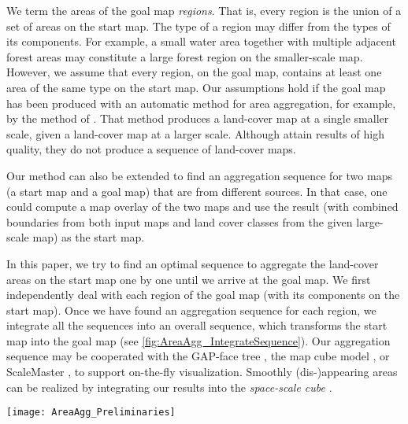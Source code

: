\documentclass[acmsmall,natbib=false]{acmart}
\begin{document}
We term the areas of the goal map \emph{regions}.
That is, every region is the union of a set of areas 
on the start map.
The type of a region may differ from the types of its components. 
For example, a small water area together with 
multiple adjacent forest areas may constitute 
a large forest region on the smaller-scale map.
However, we assume that every region, on the goal map, 
contains at least one area of the same type on the start map.
Our assumptions hold if the goal map has been produced 
with an automatic method for area aggregation, 
for example, by the method of \citet{HaunertWolff2010AreaAgg}.
That method produces a land-cover map at a single smaller scale, 
given a land-cover map at a larger scale.
Although \textcite{HaunertWolff2010AreaAgg}
attain results of high quality, 
they do not produce a sequence of land-cover maps.

Our method can also be extended to find an aggregation sequence 
for two maps (a start map and a goal map) that are from different sources.
In that case, one could compute a map overlay of the two maps
and use the result 
(with combined boundaries from both input maps and land cover classes 
from the given large-scale map) 
as the start map.

In this paper, we try to find an optimal sequence
to aggregate the land-cover areas on the start map
one by one until we arrive at the goal map.
We first independently deal with each region of the goal map 
(with its components on the start map).
Once we have found an aggregation sequence for each region, 
we integrate all the sequences into an overall sequence,
which transforms the start map into the goal map
(see \fig\ref{fig:AreaAgg_IntegrateSequence}). 
Our aggregation sequence may be cooperated with
the GAP-face tree \citep{vanOosterom2005},
the map cube model \citep{Timpf1998},
or ScaleMaster \citep{Brewer2007Guidelines,Touya2013ScaleMaster}, 
to support on-the-fly visualization.
Smoothly (dis-)appearing areas can be realized
by integrating our results into the \emph{space-scale cube}
\parencite{vanOosterom2014tGAP,vanOosterom2014tGAPSSC}.

\begin{figure*}[tb]
\centering
\texttt{[image: AreaAgg\_Preliminaries]}
\caption{Integrating two aggregation sequences 
	of different regions: 
	the resulting sequence contains the given sequences 
	as subsequences and 
	always takes the subdivision with smallest patch next.
	The gray arrows show the integration of the two regions.
}
\label{fig:AreaAgg_IntegrateSequence}
\end{figure*}
\end{document}
